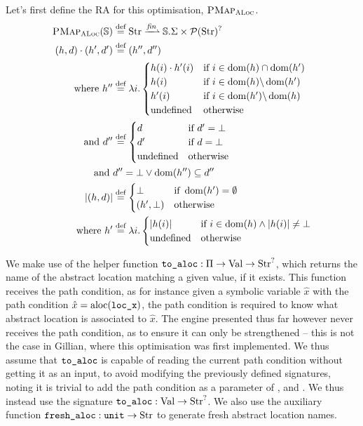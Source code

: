 Let's first define the RA for this optimisation, $\textsc{PMap}_{\textsc{ALoc}}$. 
\begin{align*}
	\ALocPMap(\mmdl) &\defeq \Str \finmap \mmdl.\Sigma \times \pset(\Str)^?\\
		(h,d)\cdot (h',d') &\defeq (h'', d'') \\
	\text{where } h''&\defeq \lambda i.\begin{cases}
		h(i)\cdot h'(i)&\If~i\in \dom(h)\cap\dom(h')\\
		h(i) &\If~i\in \dom(h) \backslash \dom(h')\\
		h'(i) &\If~i\in \dom(h') \backslash \dom(h)\\
		\text{undefined}&\Otherwise
	\end{cases}\\
	\text{and }d''&\defeq\begin{cases}
		d&\If~d'=\bot\\
		d'&\If~d=\bot\\
		\text{undefined}&\Otherwise
	\end{cases}\\
	\text{and }& d'' = \bot \lor \dom(h'')\subseteq d''\\
	|(h, d)| &\defeq \begin{cases}
		\bot &\If~\dom(h')=\emptyset\\
		(h', \bot) &\Otherwise
	\end{cases}\\
	\text{where }h'&\defeq \lambda i.\begin{cases}
		|h(i)| &\If~ i\in\dom(h) \land |h(i)| \neq \bot\\
		\text{undefined} &\Otherwise
	\end{cases}
\end{align*}

We make use of the helper function ${\texttt{to\_aloc}:\Pi\rightarrow \text{Val}\rightarrow \text{Str}^?}$, which returns the name of the abstract location matching a given value, if it exists.  This function receives the path condition, as for instance given a symbolic variable $\hat x$ with the path condition $\hat x = \text{aloc}(\texttt{loc\_x})$, the path condition is required to know what abstract location is associated to $\hat x$. The engine presented thus far however never receives the path condition, as to ensure it can only be strengthened -- this is not the case in Gillian, where this optimisation was first implemented. We thus assume that $\texttt{to\_aloc}$ is capable of reading the current path condition without getting it as an input, to avoid modifying the previously defined signatures, noting it is trivial to add the path condition as a parameter of \execac, \consume{} and \produce. We thus instead use the signature ${\texttt{to\_aloc}: \text{Val}\rightarrow\text{Str}^?}$. We also use the auxiliary function $\texttt{fresh\_aloc}: \texttt{unit} \rightarrow \text{Str}$ to generate fresh abstract location names.

